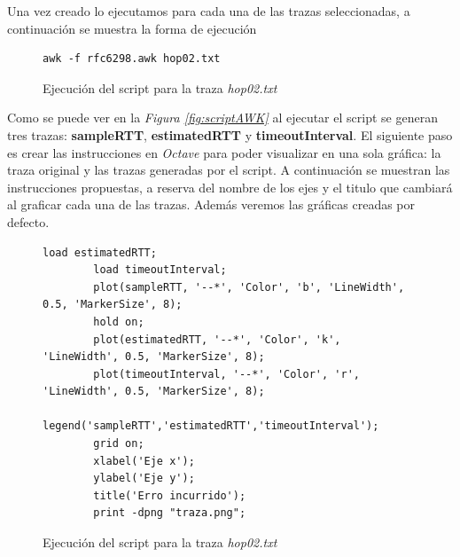 \noindent Una vez creado lo ejecutamos para cada una de las trazas seleccionadas, a continuaci\'on se muestra la forma de
ejecuci\'on 

\begin{figure}[H]
    \centering
    \begin{lstlisting}[frame=single, breaklines=true, basicstyle=\footnotesize\ttfamily, breakatwhitespace=false, 
        columns=flexible, tabsize=2, showstringspaces=fals] 
        awk -f rfc6298.awk hop02.txt
    \end{lstlisting}
    \caption{Ejecuci\'on del script para la traza \textit{hop02.txt}}
    \label{fig:execScript}
\end{figure}

\noindent Como se puede ver en la \textit{Figura \ref*{fig:scriptAWK}} al ejecutar el script se generan tres trazas: 
\textbf{sampleRTT}, \textbf{estimatedRTT} y \textbf{timeoutInterval}. El siguiente paso es crear las instrucciones en 
\textit{Octave} para poder visualizar en una sola gr\'afica: la traza original y las trazas generadas por el script. 
A continuaci\'on se muestran las instrucciones propuestas, a reserva del nombre de los ejes y el titulo que cambiar\'a
al graficar cada una de las trazas. Adem\'as veremos las gr\'aficas creadas por defecto.

\begin{figure}[H]
    \centering
    \begin{lstlisting}[frame=single, breaklines=true, basicstyle=\footnotesize\ttfamily, breakatwhitespace=false, 
        columns=flexible, tabsize=2, showstringspaces=fals] 
        load estimatedRTT;
        load timeoutInterval;
        plot(sampleRTT, '--*', 'Color', 'b', 'LineWidth', 0.5, 'MarkerSize', 8);
        hold on;
        plot(estimatedRTT, '--*', 'Color', 'k', 'LineWidth', 0.5, 'MarkerSize', 8);
        plot(timeoutInterval, '--*', 'Color', 'r', 'LineWidth', 0.5, 'MarkerSize', 8);
        legend('sampleRTT','estimatedRTT','timeoutInterval');
        grid on;
        xlabel('Eje x');
        ylabel('Eje y');
        title('Erro incurrido');
        print -dpng "traza.png";
    \end{lstlisting}
    \caption{Ejecuci\'on del script para la traza \textit{hop02.txt}}
    \label{fig:execScript1}
\end{figure}

\newpage

